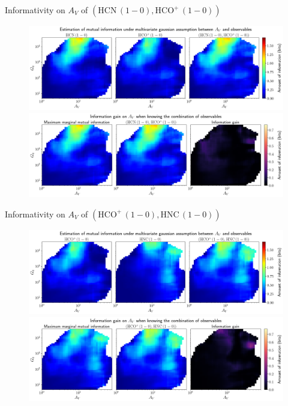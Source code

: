 \documentclass{beamer}
\begin{document}
\begin{frame}{Informativity on $A_V$ of $\left(\mathrm{HCN\,(1-0)},\mathrm{HCO^+\,(1-0)}\right)$}
    \begin{figure}
        \centering
        \includegraphics[width=0.95\linewidth]{../linearinfogauss/av__hcn10_hcop10_linearinfogauss.png}
        \vfill
        \includegraphics[width=0.95\linewidth]{../linearinfogauss/av__hcn10_hcop10_linearinfogauss_gain.png}
    \end{figure}
\end{frame}

\begin{frame}{Informativity on $A_V$ of $\left(\mathrm{HCO^+\,(1-0)},\mathrm{HNC\,(1-0)}\right)$}
    \begin{figure}
        \centering
        \includegraphics[width=0.95\linewidth]{../linearinfogauss/av__hcop10_hnc10_linearinfogauss.png}
        \vfill
        \includegraphics[width=0.95\linewidth]{../linearinfogauss/av__hcop10_hnc10_linearinfogauss_gain.png}
    \end{figure}
\end{frame}
\end{document}
